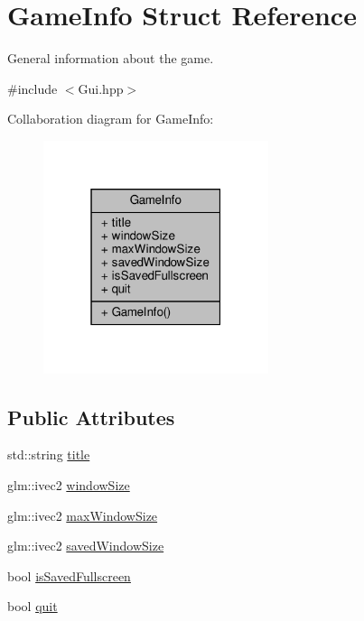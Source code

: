 \hypertarget{struct_game_info}{}\section{Game\+Info Struct Reference}
\label{struct_game_info}


General information about the game.  




{\ttfamily \#include $<$Gui.\+hpp$>$}



Collaboration diagram for Game\+Info\+:
\nopagebreak
\begin{figure}[H]
\begin{center}
\leavevmode
\includegraphics[width=187pt]{struct_game_info__coll__graph}
\end{center}
\end{figure}
\subsection*{Public Attributes}
\begin{DoxyCompactItemize}
\item 
std\+::string \hyperlink{struct_game_info_aa91c7a78dac02194f74190e511641198}{title}
\item 
glm\+::ivec2 \hyperlink{struct_game_info_a8dce192fef699b9f1fddbf02bf3500cd}{window\+Size}
\item 
glm\+::ivec2 \hyperlink{struct_game_info_a3f897911825a01cf4a1c4b89097ac523}{max\+Window\+Size}
\item 
glm\+::ivec2 \hyperlink{struct_game_info_a469e344fc49843ac1ca7816afeb3f99b}{saved\+Window\+Size}
\item 
bool \hyperlink{struct_game_info_ad4971e06ad6b5bcb8e489b755a8eb96e}{is\+Saved\+Fullscreen}
\item 
bool \hyperlink{struct_game_info_af697697c3da30244af3275062f0a0cdf}{quit}
\end{DoxyCompactItemize}


